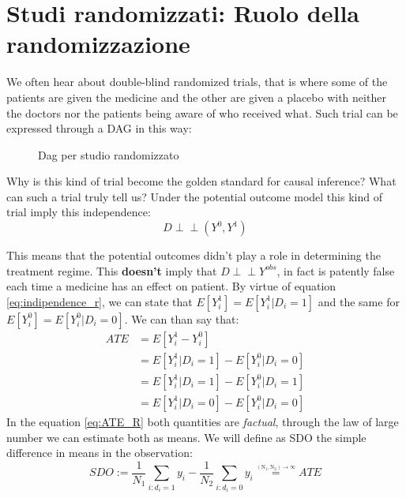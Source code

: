 \section{Studi randomizzati: Ruolo della randomizzazione}
We often hear about double-blind randomized trials, that is where some of the patients are given the medicine and the other are given a placebo with neither the doctors nor the patients being aware of who received what. Such trial can be expressed through a DAG in this way: 
\begin{figure}[H]
\centering
\caption{Dag per studio randomizzato}
\label{fig:dag_random_EX}
\end{figure}
Why is this kind of trial become the golden standard for causal inference? What can such a trial truly tell us?
Under the potential outcome model this kind of trial imply this independence:
\begin{equation}
D \perp\!\!\!\perp (Y^{0},Y^{1})
\end{equation}
\label{eq:indipendence_r}

This means that the potential outcomes didn't play a role in determining the treatment regime. This \textbf{doesn't} imply that $D \perp\!\!\!\perp Y^{obs}$, in fact is patently false each time a medicine has an effect on patient. By virtue of equation \ref{eq:indipendence_r}, we can state that $E[Y^1_i] = E[Y^{1}_i | D_i = 1]  $ and the same for $E[Y^0_i] = E[Y^{0}_i | D_i = 0] $.
We can than say that:
\begin{align}
ATE &= E[Y^1_i-Y^0_i ] \\ 
 &= E[Y^{1}_i | D_i = 1]- E[Y^{0}_i | D_i = 0]\label{eq:ATE_R} \\
	& =E[Y^{1}_i | D_i = 1]- E[Y^{0}_i | D_i = 1] \label{eq:ATT_R} \\
 &= E[Y^{1}_i | D_i = 0]- E[Y^{0}_i | D_i = 0] \label{eq:ATU_R}
  \end{align}
In the equation \ref{eq:ATE_R} both quantities are \textit{factual}, through the law of large number we can estimate both as means. We will define as SDO the simple difference in means in the observation:
$$SDO := \frac{1}{N_1}\sum_{i:d_i=1}y_i - \frac{1}{N_2}\sum_{i:d_i=0}y_i \overset{\underset{\mathrm{(N_1, N_2) \rightarrow \infty}}{}}{=} ATE$$

